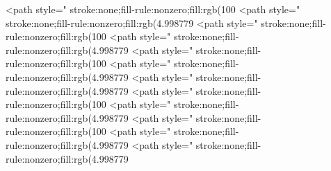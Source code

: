 <path style=" stroke:none;fill-rule:nonzero;fill:rgb(100%
<path style=" stroke:none;fill-rule:nonzero;fill:rgb(4.998779%
<path style=" stroke:none;fill-rule:nonzero;fill:rgb(100%
<path style=" stroke:none;fill-rule:nonzero;fill:rgb(4.998779%
<path style=" stroke:none;fill-rule:nonzero;fill:rgb(100%
<path style=" stroke:none;fill-rule:nonzero;fill:rgb(4.998779%
<path style=" stroke:none;fill-rule:nonzero;fill:rgb(4.998779%
<path style=" stroke:none;fill-rule:nonzero;fill:rgb(100%
<path style=" stroke:none;fill-rule:nonzero;fill:rgb(4.998779%
<path style=" stroke:none;fill-rule:nonzero;fill:rgb(100%
<path style=" stroke:none;fill-rule:nonzero;fill:rgb(4.998779%
<path style=" stroke:none;fill-rule:nonzero;fill:rgb(4.998779%
